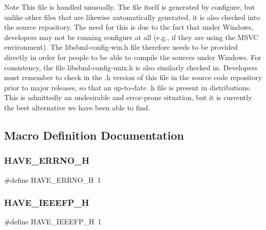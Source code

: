 \begin{DoxyNote}{Note}
This file is handled unusually. The file itself is generated by {\ttfamily configure}, but unlike other files that are likewise automatically generated, it is also checked into the source repository. The need for this is due to the fact that under Windows, developers may not be running {\ttfamily configure} at all (e.\+g., if they are using the M\+S\+VC environment). The {\ttfamily libsbml-\/config-\/win.\+h} file therefore needs to be provided directly in order for people to be able to compile the sources under Windows. For consistency, the file {\ttfamily libsbml-\/config-\/unix.\+h} is also similarly checked in. Developers must remember to check in the .h version of this file in the source code repository prior to major releases, so that an up-\/to-\/date .h file is present in distributions. This is admittedly an undesirable and error-\/prone situation, but it is currently the best alternative we have been able to find. 
\end{DoxyNote}


\subsection{Macro Definition Documentation}
\mbox{\label{libsbml-config-common_8h_ae655a511fd230d2fd6b99ff2801df201}} 
\subsubsection{\texorpdfstring{H\+A\+V\+E\+\_\+\+E\+R\+R\+N\+O\+\_\+H}{HAVE\_ERRNO\_H}}
{\footnotesize\ttfamily \#define H\+A\+V\+E\+\_\+\+E\+R\+R\+N\+O\+\_\+H~1}

\mbox{\label{libsbml-config-common_8h_ac72000aa2a629426f49e18a21fcb5e76}} 
\subsubsection{\texorpdfstring{H\+A\+V\+E\+\_\+\+I\+E\+E\+E\+F\+P\+\_\+H}{HAVE\_IEEEFP\_H}}
{\footnotesize\ttfamily \#define H\+A\+V\+E\+\_\+\+I\+E\+E\+E\+F\+P\+\_\+H~1}

